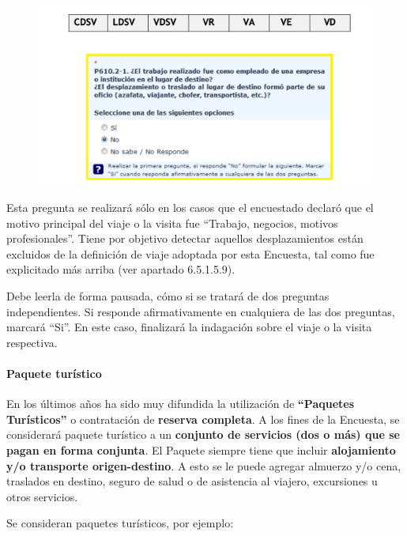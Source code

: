 \documentclass[
  openany]{book}
\begin{document}
\begin{figure}

{\centering \includegraphics[width=1\linewidth]{imagenes/figura6-101} 

}

\end{figure}

Esta pregunta se realizará sólo en los casos que el encuestado declaró que el motivo principal del viaje o la visita fue ``Trabajo, negocios, motivos profesionales''. Tiene por objetivo detectar aquellos desplazamientos están excluidos de la definición de viaje adoptada por esta Encuesta, tal como fue explicitado más arriba (ver apartado 6.5.1.5.9).

Debe leerla de forma pausada, cómo si se tratará de dos preguntas independientes. Si responde afirmativamente en cualquiera de las dos preguntas, marcará ``Si''. En este caso, finalizará la indagación sobre el viaje o la visita respectiva.

\hypertarget{paquete-turuxedstico}{%
\paragraph{Paquete turístico}\label{paquete-turuxedstico}}

En los últimos años ha sido muy difundida la utilización de \textbf{``Paquetes Turísticos''} o contratación de \textbf{reserva completa}. A los fines de la Encuesta, se considerará paquete turístico a un \textbf{conjunto de servicios (dos o más) que se pagan en forma conjunta}. El Paquete siempre tiene que incluir \textbf{alojamiento y/o transporte origen-destino}. A esto se le puede agregar almuerzo y/o cena, traslados en destino, seguro de salud o de asistencia al viajero, excursiones u otros servicios.

Se consideran paquetes turísticos, por ejemplo:
\end{document}
